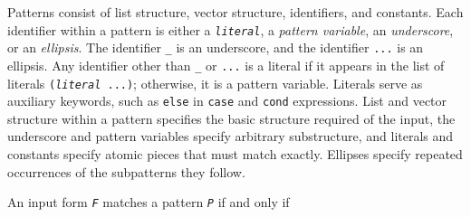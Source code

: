 \label{syntax_s16}Patterns consist of list structure, vector structure,
identifiers, and
constants.
Each identifier within a pattern is either a \texttt{\textit{literal}},
a \label{syntax_s17}\textit{pattern variable},
an \label{syntax_s18}\label{syntax_s19}\textit{underscore},
or an
\label{syntax_s20}\label{syntax_s21}\textit{ellipsis}.
The identifier \texttt{\_{}} is an underscore, and
the identifier \texttt{...} is an ellipsis.
Any identifier other than \texttt{\_{}} or \texttt{...} is a literal if it appears
in the list of literals
\texttt{(\textit{literal} ...)};
otherwise, it is a pattern variable.
Literals serve as \label{syntax_s22}auxiliary keywords, such as \texttt{else} in
\texttt{case} and \texttt{cond} expressions.
List and vector structure within a pattern specifies the basic structure
required of the input, the underscore and pattern variables specify arbitrary
substructure, and literals and constants specify atomic pieces
that must match exactly.
Ellipses specify repeated occurrences of the subpatterns they
follow.


\label{syntax_patterns}An input form \texttt{\textit{F}} matches a pattern \texttt{\textit{P}} if and only if

